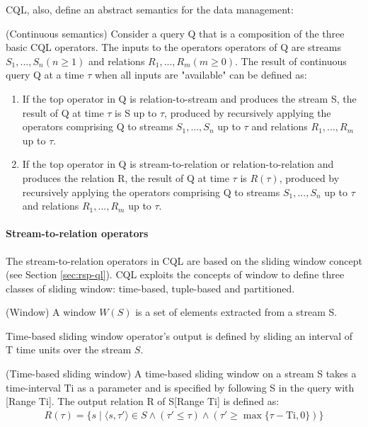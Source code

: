 CQL, also, define an abstract semantics for the data management:
\begin{Definition}
(Continuous semantics) Consider a query Q that is a composition of the three basic CQL operators. 
The inputs to the operators operators of Q are streams $S_1, ..., S_n (n \geq 1)$ and relations $R_1,..., R_m (m \geq 0)$. 
The result of continuous query Q at a time $\tau$ when all inputs are "available" can be defined as:
\begin{enumerate}
\item If the top operator in Q is relation-to-stream and produces the stream S, the result of Q at time $\tau$ is S up to $\tau$, produced by recursively applying the operators comprising Q to streams $S_1, ..., S_n$ up to $\tau$ and relations $R_1,..., R_m$ up to $\tau$.
\item If the top operator in Q is stream-to-relation or relation-to-relation and produces the relation R, the result of Q at time $\tau$ is $R(\tau)$, produced by recursively applying the operators comprising Q to streams $S_1, ..., S_n$ up to $\tau$ and relations $R_1,..., R_m$ up to $\tau$.
\end{enumerate}
\end{Definition}

\paragraph{Stream-to-relation operators}
The stream-to-relation operators in CQL are based on the sliding window concept (see Section \ref{sec:rsp-ql}). CQL exploits the concepts of window to define three classes of sliding window: time-based, tuple-based and partitioned.

\begin{Definition}
(Window) A window $W(S)$ is a set of elements extracted from a stream S. 
\end{Definition}

Time-based sliding window operator's output is defined by sliding an interval of T time units over the stream $S$. 
\begin{Definition}
(Time-based sliding window) A time-based sliding window on a stream S takes a time-interval $\mathrm{Ti}$ as a parameter and is specified by following S in the query with [Range $\mathrm{Ti}$].
The output relation R of S[Range $\mathrm{Ti}$] is defined as:
\noindent\begin{align*}
R(\tau)=\{s \mid \langle s,\tau' \rangle \in S \wedge (\tau' \leq \tau) \wedge (\tau' \geq \max\{\tau - \mathrm{Ti},0\})\}
\end{align*}  
\end{Definition}

